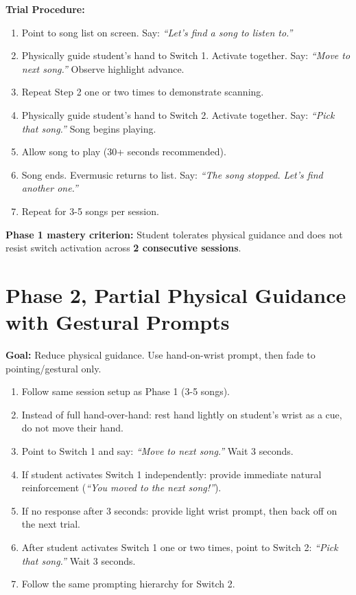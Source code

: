 \documentclass[justified,openright]{tufte-book}
\begin{document}
\textbf{Trial Procedure:}

\begin{enumerate}
\item
  Point to song list on screen. Say: \emph{``Let's find a song to listen
  to.''}
\item
  Physically guide student's hand to Switch 1. Activate together. Say:
  \emph{``Move to next song.''} Observe highlight advance.
\item
  Repeat Step 2 one or two times to demonstrate scanning.
\item
  Physically guide student's hand to Switch 2. Activate together. Say:
  \emph{``Pick that song.''} Song begins playing.
\item
  Allow song to play (30+ seconds recommended).
\item
  Song ends. Evermusic returns to list. Say: \emph{``The song stopped.
  Let's find another one.''}
\item
  Repeat for 3-5 songs per session.
\end{enumerate}

\textbf{Phase 1 mastery criterion:} Student tolerates physical guidance
and does not resist switch activation across \textbf{2 consecutive
sessions}.

\section{Phase 2, Partial Physical Guidance with Gestural
Prompts}\label{phase-2-partial-physical-guidance-with-gestural-prompts}

\textbf{Goal:} Reduce physical guidance. Use hand-on-wrist prompt, then
fade to pointing/gestural only.

\begin{enumerate}
\item
  Follow same session setup as Phase 1 (3-5 songs).
\item
  Instead of full hand-over-hand: rest hand lightly on student's wrist
  as a cue, do not move their hand.
\item
  Point to Switch 1 and say: \emph{``Move to next song.''} Wait 3
  seconds.
\item
  If student activates Switch 1 independently: provide immediate natural
  reinforcement (\emph{``You moved to the next song!''}).
\item
  If no response after 3 seconds: provide light wrist prompt, then back
  off on the next trial.
\item
  After student activates Switch 1 one or two times, point to Switch 2:
  \emph{``Pick that song.''} Wait 3 seconds.
\item
  Follow the same prompting hierarchy for Switch 2.
\end{enumerate}
\end{document}

